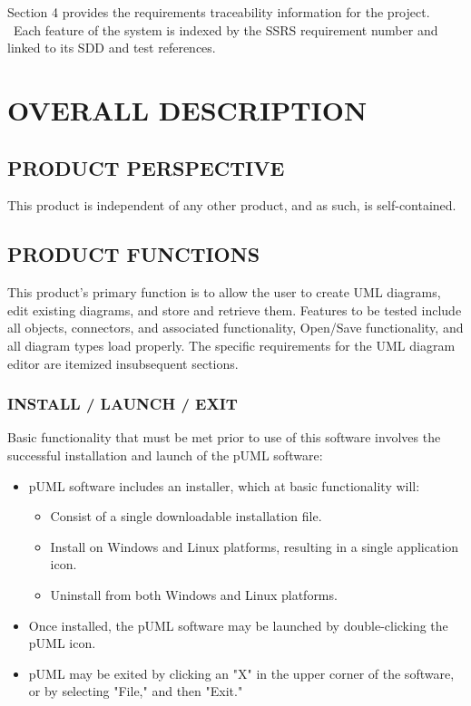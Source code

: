 \documentclass[twoside,letterpaper]{article}
\begin{document}
\bigskip

{
Section 4 provides the requirements traceability information for the
project. \ Each feature of the system is indexed by the SSRS
requirement number and linked to its SDD and test references.}




\clearpage\section[OVERALL DESCRIPTION]{\bfseries
OVERALL DESCRIPTION}

\subsection[PRODUCT PERSPECTIVE]{\bfseries
PRODUCT PERSPECTIVE}
{
This product is independent of any other product, and as such, is self-contained.
}

\subsection[PRODUCT FUNCTIONS ]
{\bfseries PRODUCT FUNCTIONS}

This product's primary function is to allow the user to create UML diagrams, edit existing diagrams, and store and retrieve them. \newline 
Features to be tested include all objects, connectors, and associated functionality, Open/Save functionality, and all diagram types load properly. The specific requirements for the UML diagram editor are itemized insubsequent sections. 

\bigskip


\subsubsection[INSTALL / LAUNCH / EXIT]
{\bfseries INSTALL / LAUNCH / EXIT}

Basic functionality that must be met prior to use of this software involves the successful installation and launch of the pUML software:
\begin{itemize}
\item pUML software includes an installer, which at basic functionality will:
\begin{itemize}
\item Consist of a single downloadable installation file.
\item Install on Windows and Linux platforms, resulting in a single application icon.
\item Uninstall from both Windows and Linux platforms.
\end{itemize}
\item Once installed, the pUML software may be launched by double-clicking the pUML icon.
\item pUML may be exited by clicking an "X" in the upper corner of the software, or by selecting "File,"  and then "Exit." 
\end{itemize}
\end{document}

